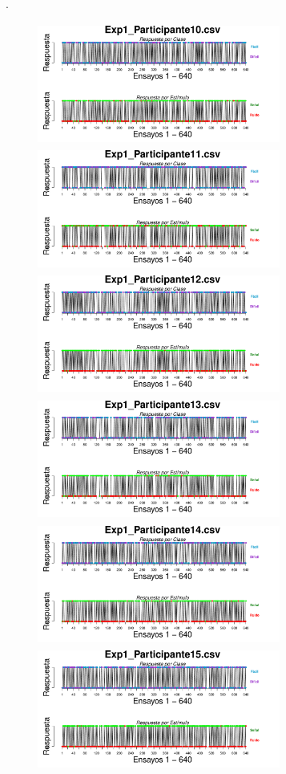 \documentclass[a4paper ]{article}
\begin{document}
\vfill .
\begin{figure}[th]
\begin{center}
\includegraphics[width=8cm, height=4cm]{Figures/BiasResp_Exp1_P10} \includegraphics[width=8cm, height=4cm]{Figures/BiasResp_Exp1_P11} \includegraphics[width=8cm, height=4cm]{Figures/BiasResp_Exp1_P12}
\includegraphics[width=8cm, height=4cm]{Figures/BiasResp_Exp1_P13} \includegraphics[width=8cm, height=4cm]{Figures/BiasResp_Exp1_P14} \includegraphics[width=8cm, height=4cm]{Figures/BiasResp_Exp1_P15}

\end{center}
\end{figure}
\end{document}
